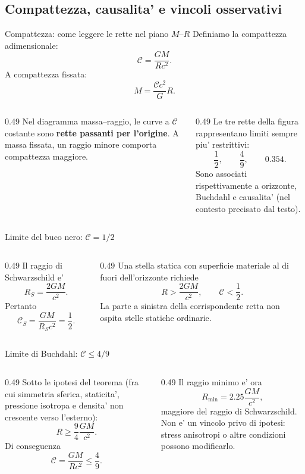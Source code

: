 \subsection{Compattezza, causalita' e vincoli osservativi}

\begin{frame}{Compattezza: come leggere le rette nel piano $M$--$R$}
\small
Definiamo la compattezza adimensionale:
\[
\mathcal C=\frac{GM}{Rc^2}.
\]
A compattezza fissata:
\[
M=\frac{\mathcal C c^2}{G}R.
\]
\begin{columns}[T,onlytextwidth]
\begin{column}{0.49\textwidth}
Nel diagramma massa--raggio, le curve a $\mathcal C$ costante sono \textbf{rette passanti per l'origine}.
\medskip
A massa fissata, un raggio minore comporta compattezza maggiore.
\end{column}
\begin{column}{0.49\textwidth}
Le tre rette della figura rappresentano limiti sempre piu' restrittivi:
\[
\frac12,\qquad\frac49,\qquad0.354.
\]
Sono associati rispettivamente a orizzonte, Buchdahl e causalita' (nel contesto precisato dal testo).
\end{column}
\end{columns}
\end{frame}

\begin{frame}{Limite del buco nero: $\mathcal C=1/2$}
\small
\begin{columns}[T,onlytextwidth]
\begin{column}{0.49\textwidth}
Il raggio di Schwarzschild e'
\[
R_S=\frac{2GM}{c^2}.
\]
Pertanto
\[
\mathcal C_S=\frac{GM}{R_Sc^2}
=\frac12.
\]
\end{column}
\begin{column}{0.49\textwidth}
Una stella statica con superficie materiale al di fuori dell'orizzonte richiede
\[
R>\frac{2GM}{c^2},
\qquad \mathcal C<\frac12.
\]
La parte a sinistra della corrispondente retta non ospita stelle statiche ordinarie.
\end{column}
\end{columns}
\end{frame}

\begin{frame}{Limite di Buchdahl: $\mathcal C\leq4/9$}
\small
\begin{columns}[T,onlytextwidth]
\begin{column}{0.49\textwidth}
Sotto le ipotesi del teorema (fra cui simmetria sferica, staticita', pressione isotropa e densita' non crescente verso l'esterno):
\[
R\geq\frac94\frac{GM}{c^2}.
\]
Di conseguenza
\[
\mathcal C=\frac{GM}{Rc^2}\leq\frac49.
\]
\end{column}
\begin{column}{0.49\textwidth}
Il raggio minimo e' ora
\[
R_{\min}=2.25\frac{GM}{c^2},
\]
maggiore del raggio di Schwarzschild.
\medskip
Non e' un vincolo privo di ipotesi: stress anisotropi o altre condizioni possono modificarlo.
\end{column}
\end{columns}
\end{frame}

